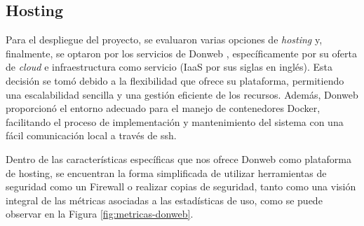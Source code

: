 \subsection{Hosting}

Para el despliegue del proyecto, se evaluaron varias opciones de \textit{hosting} y, finalmente, se optaron por los servicios de Donweb \citep{DonwebWebsite}, específicamente por su oferta de \textit{cloud} e infraestructura como servicio (IaaS por sus siglas en inglés). Esta decisión se tomó debido a la flexibilidad que ofrece su plataforma, permitiendo una escalabilidad sencilla y una gestión eficiente de los recursos. Además, Donweb proporcionó el entorno adecuado para el manejo de contenedores Docker, facilitando el proceso de implementación y mantenimiento del sistema con una fácil comunicación local a través de ssh.

Dentro de las características específicas que nos ofrece Donweb como plataforma de hosting, se encuentran la forma simplificada de utilizar herramientas de seguridad como un Firewall o realizar copias de seguridad, tanto como una visión integral de las métricas asociadas a las estadísticas de uso, como se puede observar en la Figura \ref{fig:metricas-donweb}.

